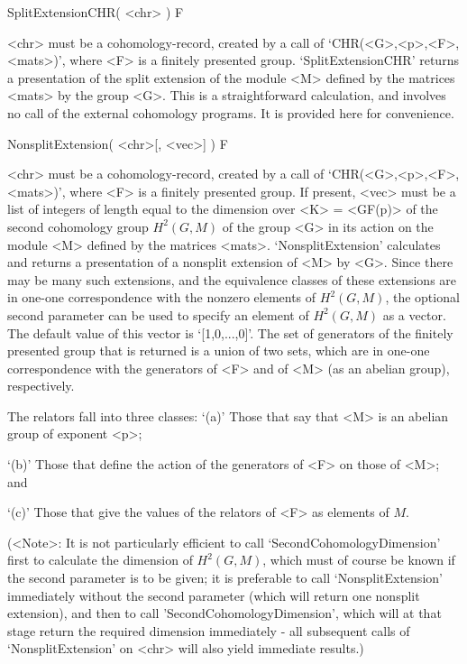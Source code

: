 
\>SplitExtensionCHR( <chr> ) F

<chr> must be a cohomology-record, created by a call of
`CHR(<G>,<p>,<F>,<mats>)', where <F> is a finitely presented group.
`SplitExtensionCHR' returns a presentation of the split extension of the module
<M> defined by the matrices <mats> by the group <G>.
This is a straightforward calculation, and involves no call of the
external cohomology programs. It is provided here for convenience.


\>NonsplitExtension( <chr>[, <vec>] ) F

<chr> must be a cohomology-record, created by a call of
`CHR(<G>,<p>,<F>,<mats>)', where <F> is a finitely presented group.
If present, <vec> must be a list of integers of length equal to the
dimension over <K> = <GF(p)> of the second cohomology group $H^2(G,M)$ of the
group <G> in its action on the module <M> defined by the matrices <mats>.
`NonsplitExtension' calculates and returns a presentation of a nonsplit
extension of <M> by <G>. Since there may be many such extensions, and
the equivalence classes of these extensions are in one-one correspondence
with the nonzero elements of $H^2(G,M)$, the optional second parameter
can be used to specify an element of $H^2(G,M)$ as a vector.
The default value of this vector is `[1,0,...,0]'.
The set of generators of the finitely presented group that is returned
is a union of two sets, which are in one-one correspondence with the
generators of <F> and of <M> (as an abelian group), respectively. 

The relators fall into three classes:
\beginitems
`(a)' Those that say that <M> is an abelian group of exponent <p>;

`(b)' Those that define the action of the generators of <F> on
those of <M>; and

`(c)' Those that give the values of the relators of <F> as elements of $M$.
\enditems

(<Note>: It is not particularly efficient to call `SecondCohomologyDimension'
first to calculate the dimension of $H^2(G,M)$, which must of course be known
if the second parameter is to be given; it is preferable to call
`NonsplitExtension' immediately without the second parameter (which will
return one nonsplit extension), and then to call 'SecondCohomologyDimension',
which will at that stage return the required dimension immediately -
all subsequent calls of `NonsplitExtension' on <chr> will also yield
immediate results.)


